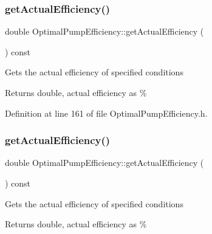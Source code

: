 \mbox{\label{class_optimal_pump_efficiency_aa2ac8a7c61bc28f82e30cb44b9c21008}} 
\subsubsection{\texorpdfstring{get\+Actual\+Efficiency()}{getActualEfficiency()}\hspace{0.1cm}{\footnotesize\ttfamily [2/3]}}
{\footnotesize\ttfamily double Optimal\+Pump\+Efficiency\+::get\+Actual\+Efficiency (\begin{DoxyParamCaption}{ }\end{DoxyParamCaption}) const\hspace{0.3cm}{\ttfamily [inline]}}

Gets the actual efficiency of specified conditions \begin{DoxyReturn}{Returns}
double, actual efficiency as \% 
\end{DoxyReturn}


Definition at line 161 of file Optimal\+Pump\+Efficiency.\+h.

\mbox{\label{class_optimal_pump_efficiency_aa2ac8a7c61bc28f82e30cb44b9c21008}} 
\subsubsection{\texorpdfstring{get\+Actual\+Efficiency()}{getActualEfficiency()}\hspace{0.1cm}{\footnotesize\ttfamily [3/3]}}
{\footnotesize\ttfamily double Optimal\+Pump\+Efficiency\+::get\+Actual\+Efficiency (\begin{DoxyParamCaption}{ }\end{DoxyParamCaption}) const\hspace{0.3cm}{\ttfamily [inline]}}

Gets the actual efficiency of specified conditions \begin{DoxyReturn}{Returns}
double, actual efficiency as \% 
\end{DoxyReturn}


